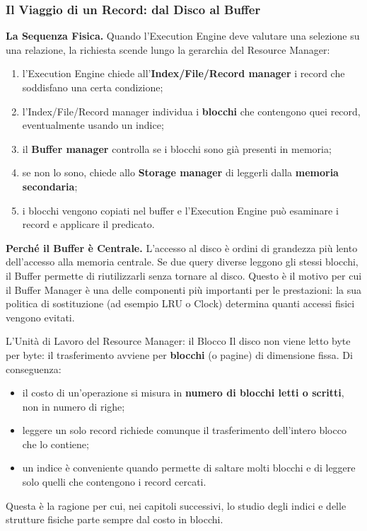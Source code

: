 \documentclass[12pt]{extarticle}
\begin{document}
\subsubsection{Il Viaggio di un Record: dal Disco al Buffer}

\noindent \textbf{La Sequenza Fisica.} Quando l'Execution Engine deve valutare una selezione su una relazione, la richiesta scende lungo la gerarchia del Resource Manager:
\begin{enumerate}
    \item l'Execution Engine chiede all'\textbf{Index/File/Record manager} i record che soddisfano una certa condizione;
    \item l'Index/File/Record manager individua i \textbf{blocchi} che contengono quei record, eventualmente usando un indice;
    \item il \textbf{Buffer manager} controlla se i blocchi sono già presenti in memoria;
    \item se non lo sono, chiede allo \textbf{Storage manager} di leggerli dalla \textbf{memoria secondaria};
    \item i blocchi vengono copiati nel buffer e l'Execution Engine può esaminare i record e applicare il predicato.
\end{enumerate}

\medskip
\noindent \textbf{Perché il Buffer è Centrale.} L'accesso al disco è ordini di grandezza più lento dell'accesso alla memoria centrale. Se due query diverse leggono gli stessi blocchi, il Buffer permette di riutilizzarli senza tornare al disco. Questo è il motivo per cui il Buffer Manager è una delle componenti più importanti per le prestazioni: la sua politica di sostituzione (ad esempio LRU o Clock) determina quanti accessi fisici vengono evitati.

\begin{cbox}{L'Unità di Lavoro del Resource Manager: il Blocco}
\noindent Il disco non viene letto byte per byte: il trasferimento avviene per \textbf{blocchi} (o pagine) di dimensione fissa. Di conseguenza:
\begin{itemize}
    \item il costo di un'operazione si misura in \textbf{numero di blocchi letti o scritti}, non in numero di righe;
    \item leggere un solo record richiede comunque il trasferimento dell'intero blocco che lo contiene;
    \item un indice è conveniente quando permette di saltare molti blocchi e di leggere solo quelli che contengono i record cercati.
\end{itemize}
\medskip
\noindent Questa è la ragione per cui, nei capitoli successivi, lo studio degli indici e delle strutture fisiche parte sempre dal costo in blocchi.
\end{cbox}
\end{document}
